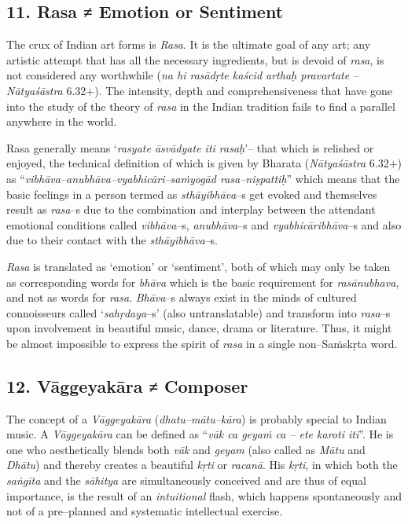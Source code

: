 \subsection*{11. Rasa ≠ Emotion or Sentiment}

The crux of Indian art forms is \textit{Rasa}. It is the ultimate goal of any art; any artistic attempt that has all the necessary ingredients, but is devoid of \textit{rasa}, is not considered any worthwhile (\textit{na hi rasādṛte kaścid arthaḥ pravartate – Nātyaśāstra} 6.32+). The intensity, depth and comprehensiveness that have gone into the study of the theory of \textit{rasa} in the Indian tradition fails to find a parallel anywhere in the world.

Rasa generally means ‘\textit{rasyate āsvādyate iti rasaḥ}’– that which is relished or enjoyed, the technical definition of which is given by Bharata (\textit{Nātyaśāstra} 6.32+) as “\textit{vibhāva–anubhāva–vyabhicāri–saṁyogād rasa–niṣpattiḥ}” which means that the basic feelings in a person termed as \textit{sthāyibhāva}–s get evoked and themselves result as \textit{rasa}­–s due to the combination and interplay between the attendant emotional conditions called \textit{vibhāva}–s, \textit{anubhāva}–s and \textit{vyabhicāribhāva}–s and also due to their contact with the \textit{sthāyibhāva}–s.

\textit{Rasa} is translated as ‘emotion’ or ‘sentiment’, both of which may only be taken as corresponding words for \textit{bhāva} which is the basic requirement for \textit{rasānubhava}, and not as words for \textit{rasa}. \textit{Bhāva}–s always exist in the minds of cultured connoisseurs called ‘\textit{sahṛdaya}–s’ (also untranslatable) and transform into \textit{rasa}–s upon involvement in beautiful music, dance, drama or literature. Thus, it might be almost impossible to express the spirit of \textit{rasa} in a single non–Saṁskṛta word.


\subsection*{12. Vāggeyakāra ≠ Composer}

The concept of a \textit{Vāggeyakāra} (\textit{dhatu–mātu–kāra}) is probably special to Indian music. A \textit{Vāggeyakāra} can be defined as “\textit{vāk ca geyaṁ ca – ete karoti iti}”. He is one who aesthetically blends both \textit{vāk} and \textit{geyam} (also called as \textit{Mātu} and \textit{Dhātu}) and thereby creates a beautiful \textit{kṛti} or \textit{racanā}. His \textit{kṛti}, in which both the \textit{saṅgīta} and the \textit{sāhitya} are simultaneously conceived and are thus of equal importance, is the result of an \textit{intuitional} flash, which happens spontaneously and not of a pre–planned and systematic intellectual exercise.

